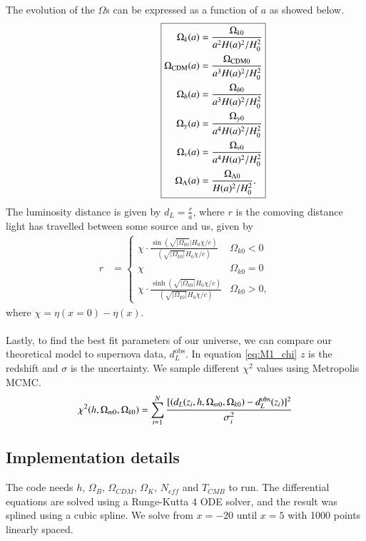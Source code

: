 \documentclass{aa}
\begin{document}
The evolution of the $\Omega$s can be expressed as a function of $a$ as showed below. 
\begin{equation}
      \hspace*{2cm}
      \boxed{
   \begin{aligned}
      \Omega_{k}(a) &= \frac{\Omega_{k0}}{a^2H(a)^2/H_0^2}\\
      \Omega_{\rm CDM}(a) &= \frac{\Omega_{\rm CDM 0}}{a^3H(a)^2/H_0^2} \\
      \Omega_b(a) &= \frac{\Omega_{b 0}}{a^3H(a)^2/H_0^2} \\
      \Omega_\gamma(a) &= \frac{\Omega_{\gamma 0}}{a^4H(a)^2/H_0^2} \\
      \Omega_{\nu}(a) &= \frac{\Omega_{\nu 0}}{a^4H(a)^2/H_0^2} \\
      \Omega_{\Lambda}(a) &= \frac{\Omega_{\Lambda 0}}{H(a)^2/H_0^2}.
   \end{aligned}
      }
\end{equation}
The luminosity distance is given by $d_L = \frac{r}{a}$, where $r$ is the comoving distance light has travelled between some source and us, given by 
$$
\boxed{
\begin{aligned}
r &= \begin{cases}
\chi \cdot \frac{\sin \left( \sqrt{|\Omega_{k 0}}| H_0 \chi /c \right)}{\left(\sqrt{|\Omega_{k 0}|}H_0\chi / c\right)} & \Omega_{k 0} < 0\\
\chi & \Omega_{k 0} =0 \\
\chi \cdot \frac{\sinh \left( \sqrt{|\Omega_{k 0}|} H_0 \chi / c\right)}{\left(\sqrt{|\Omega_{k 0}|}H_0\chi / c\right) } & \Omega_{k 0} > 0,
\end{cases}
\end{aligned}
}
$$
where $\chi= \eta(x=0)-\eta(x)$.\\
\\
Lastly, to find the best fit parameters of our universe, we can compare our theoretical model to supernova data, $d_L^\mathrm{obs}$. In equation \ref{eq:M1_chi} 
$z$ is the redshift and $\sigma$ is the uncertainty. We sample different $\chi^2$ values using Metropolis MCMC.
\begin{equation} \label{eq:M1_chi}
\chi^2(h,\Omega_{m0}, \Omega_{k0}) = \sum_{i=1}^N \frac{[(d_L(z_i,h,\Omega_{m0},\Omega_{k0}) - d_L^{\rm obs}(z_i)]^2 }{\sigma_i^2}
\end{equation}

\subsection{Implementation details}
The code needs $h$, $\Omega_B$, $\Omega_{CDM}$, $\Omega_K$, $N_{eff}$ and $T_{CMB}$ to run. 
The differential equations are solved using a Runge-Kutta 4 ODE solver, and the result was splined using a cubic spline.
We solve from $x=-20$ until $x=5$ with 1000 points linearly spaced.
\end{document}
